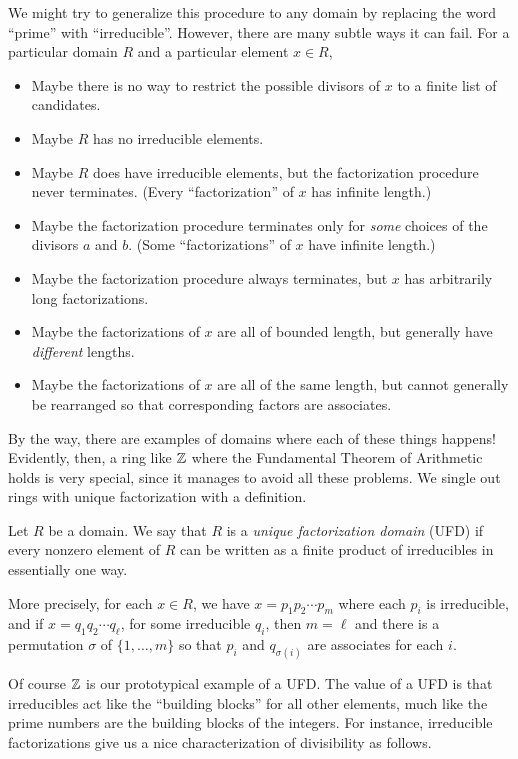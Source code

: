 We might try to generalize this procedure to any domain by replacing the word ``prime'' with ``irreducible''. However, there are many subtle ways it can fail. For a particular domain \(R\) and a particular element \(x \in R\),
\begin{itemize}
\item Maybe there is no way to restrict the possible divisors of \(x\) to a finite list of candidates.
\item Maybe \(R\) has no irreducible elements.
\item Maybe \(R\) does have irreducible elements, but the factorization procedure never terminates. (Every ``factorization'' of \(x\) has infinite length.)
\item Maybe the factorization procedure terminates only for \emph{some} choices of the divisors \(a\) and \(b\). (Some ``factorizations'' of \(x\) have infinite length.)
\item Maybe the factorization procedure always terminates, but \(x\) has arbitrarily long factorizations.
\item Maybe the factorizations of \(x\) are all of bounded length, but generally have \emph{different} lengths.
\item Maybe the factorizations of \(x\) are all of the same length, but cannot generally be rearranged so that corresponding factors are associates.
\end{itemize}

By the way, there are examples of domains where each of these things happens! Evidently, then, a ring like \(\mathbb{Z}\) where the Fundamental Theorem of Arithmetic holds is very special, since it manages to avoid all these problems. We single out rings with unique factorization with a definition.

\begin{dfn} \label{dfn:ufd}
Let \(R\) be a domain. We say that \(R\) is a \emph{unique factorization domain} (UFD) if every nonzero element of \(R\) can be written as a finite product of irreducibles in essentially one way.

More precisely, for each \(x \in R\), we have \(x = p_1 p_2 \cdots p_m\) where each \(p_i\) is irreducible, and if \(x = q_1 q_2 \cdots q_\ell\), for some irreducible \(q_i\), then \(m = \ell\) and there is a permutation \(\sigma\) of \(\{1, \ldots, m\}\) so that \(p_i\) and \(q_{\sigma(i)}\) are associates for each \(i\). 
\end{dfn}

Of course \(\mathbb{Z}\) is our prototypical example of a UFD. The value of a UFD is that irreducibles act like the ``building blocks'' for all other elements, much like the prime numbers are the building blocks of the integers. For instance, irreducible factorizations give us a nice characterization of divisibility as follows.

